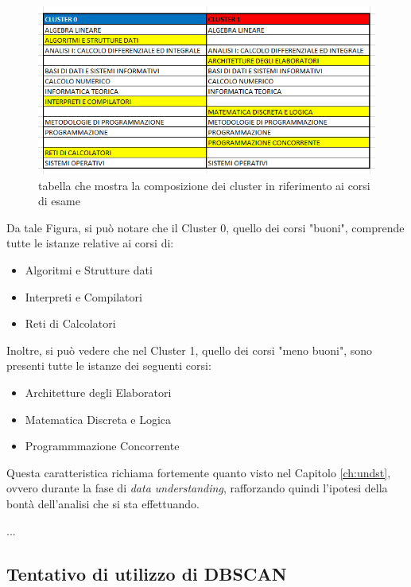         \begin{figure}
            \centering
            \caption{tabella che mostra la composizione dei cluster in riferimento ai corsi di esame}
            \label{tabella}
            \includegraphics[scale=0.5]{../cluster/min_kmeans_2cl_corsi_cluster.png}
        \end{figure}

        Da tale Figura, si può notare che il Cluster 0, quello dei corsi "buoni", comprende tutte le istanze relative ai corsi di:

        \begin{itemize}
            \item Algoritmi e Strutture dati
            \item Interpreti e Compilatori
            \item Reti di Calcolatori
        \end{itemize}

        Inoltre, si può vedere che nel Cluster 1, quello dei corsi "meno buoni", sono presenti tutte le istanze dei seguenti corsi:

        \begin{itemize}
            \item Architetture degli Elaboratori
            \item Matematica Discreta e Logica
            \item Programmmazione Concorrente
        \end{itemize}

        Questa caratteristica richiama fortemente quanto visto nel Capitolo \ref{ch:undst}, ovvero durante la fase di \textit{data understanding}, rafforzando quindi l'ipotesi della bontà dell'analisi che si sta effettuando.

        ...

    \subsection{Tentativo di utilizzo di DBSCAN}

